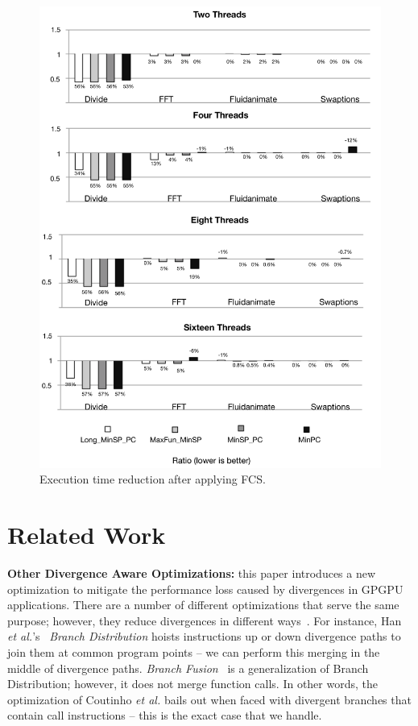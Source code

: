 \documentclass[times,10pt,twocolumn]{article}
\begin{document}
\begin{figure}[t!]
\begin{center}
\includegraphics[width=1\columnwidth]{images/ResultsFuncFusion}
\end{center}
\caption{\label{fig:Results}
Execution time reduction after applying FCS.}
\end{figure}


\section{Related Work}
\label{sec:rw}

\noindent
\textbf{Other Divergence Aware Optimizations:} this paper introduces a new
optimization to mitigate the performance loss
caused by divergences in GPGPU applications.
There are a number of different optimizations that serve the same purpose;
however, they reduce divergences in different
ways~\cite{Carrillo09,Coutinho11,Han11,Lee09,Zhang10a,Zhang11}.
For instance, Han {\em et al.}'s~\cite{Han11} {\em Branch Distribution}
hoists instructions up or down divergence paths to join them at common
program points -- we can perform this merging in the middle of divergence paths.
{\em Branch Fusion}~\cite{Coutinho11} is a generalization of Branch Distribution;
however, it does not merge function calls.
In other words, the optimization of Coutinho {\em et al.} bails out when faced
with divergent branches that contain call instructions -- this is the exact
case that we handle.
\end{document}
